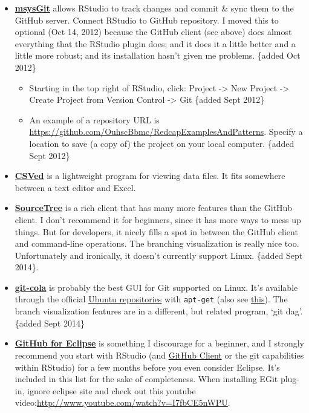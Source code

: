 \documentclass[
]{book}
\providecommand{\tightlist}{%
  \setlength{\itemsep}{0pt}\setlength{\parskip}{0pt}}
\begin{document}
\begin{itemize}
\item
  \textbf{\href{http://msysgit.github.com/}{msysGit}} allows RStudio to track changes and commit \& sync them to the GitHub server. Connect RStudio to GitHub repository. I moved this to optional (Oct 14, 2012) because the GitHub client (see above) does almost everything that the RStudio plugin does; and it does it a little better and a little more robust; and its installation hasn't given me problems. \{added Oct 2012\}

  \begin{itemize}
  \tightlist
  \item
    Starting in the top right of RStudio, click: Project -\textgreater{} New Project -\textgreater{} Create Project from Version Control -\textgreater{} Git \{added Sept 2012\}
  \item
    An example of a repository URL is \url{https://github.com/OuhscBbmc/RedcapExamplesAndPatterns}. Specify a location to save (a copy of) the project on your local computer. \{added Sept 2012\}
  \end{itemize}
\item
  \textbf{\href{http://csved.sjfrancke.nl/}{CSVed}} is a lightweight program for viewing data files. It fits somewhere between a text editor and Excel.
\item
  \textbf{\href{http://www.sourcetreeapp.com/}{SourceTree}} is a rich client that has many more features than the GitHub client. I don't recommend it for beginners, since it has more ways to mess up things. But for developers, it nicely fills a spot in between the GitHub client and command-line operations. The branching visualization is really nice too. Unfortunately and ironically, it doesn't currently support Linux. \{added Sept 2014\}.
\item
  \textbf{\href{http://git-cola.github.io/}{git-cola}} is probably the best GUI for Git supported on Linux. It's available through the official \href{http://packages.ubuntu.com/search?keywords=git-cola}{Ubuntu repositories} with \texttt{apt-get} (also see \href{https://apps.ubuntu.com/cat/applications/git-cola/}{this}). The branch visualization features are in a different, but related program, `git dag'. \{added Sept 2014\}
\item
  \textbf{\href{http://eclipse.github.com/}{GitHub for Eclipse}} is something I discourage for a beginner, and I strongly recommend you start with RStudio (and \href{http://windows.github.com/}{GitHub Client} or the git capabilities within RStudio) for a few months before you even consider Eclipse. It's included in this list for the sake of completeness. When installing EGit plug-in, ignore eclipse site and check out this youtube video:\url{http://www.youtube.com/watch?v=I7fbCE5nWPU}.

\end{itemize}
\end{document}
